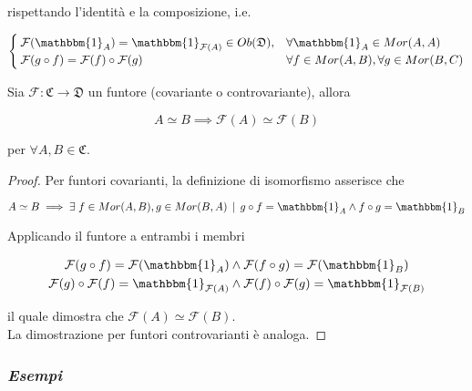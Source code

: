 rispettando l'identità e la composizione, i.e.

\begin{equation}
	\begin{cases}
		\mathcal{F}(\mathbbm{1}_{A}) = \mathbbm{1}_{\mathcal{F}(A)} \in Ob(\mathfrak{D}), & \forall \mathbbm{1}_{A} \in Mor(A,A)\\
		\mathcal{F}(g \circ f) = \mathcal{F}(f) \circ \mathcal{F}(g) & \forall f \in Mor(A,B), \forall g \in Mor(B,C)
	\end{cases}
\end{equation}

\begin{remark}
	Sia $ \mathcal{F} : \mathfrak{C} \to \mathfrak{D} $ un funtore (covariante o controvariante), allora
	
	\begin{equation}
		A \simeq B \implies \mathcal{F}(A) \simeq \mathcal{F}(B)
	\end{equation}
	
	per $ \forall A,B \in \mathfrak{C} $.
\end{remark}

\begin{proof}
	Per funtori covarianti, la definizione di isomorfismo asserisce che
	
	\begin{equation}
		A \simeq B \implies \E f \in Mor(A,B), g \in Mor(B,A) \, \mid \, g \circ f = \mathbbm{1}_{A} \wedge f \circ g = \mathbbm{1}_{B}
	\end{equation}
	
	Applicando il funtore a entrambi i membri
	
	\begin{align}
		\begin{split}
			\mathcal{F}(g \circ f) = \mathcal{F}(\mathbbm{1}_{A}) &\wedge \mathcal{F}(f \circ g) = \mathcal{F}(\mathbbm{1}_{B})\\
			\mathcal{F}(g) \circ \mathcal{F}(f) = \mathbbm{1}_{\mathcal{F}(A)} &\wedge \mathcal{F}(f) \circ \mathcal{F}(g) = \mathbbm{1}_{\mathcal{F}(B)}
		\end{split}
	\end{align}
	
	il quale dimostra che $ \mathcal{F}(A) \simeq \mathcal{F}(B) $.\\
	La dimostrazione per funtori controvarianti è analoga.
\end{proof}

\subsubsection{\textit{Esempi}}

